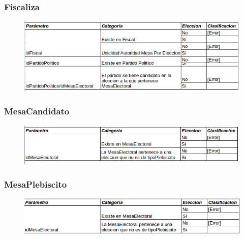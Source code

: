 \subsubsection{Fiscaliza}

\begin{figure}[H]
   \begin{center}
   \includegraphics[scale=0.7]{graphics/fiscaliza.png}
   \label{fig:der}
   \end{center}
\end{figure}


\subsubsection{MesaCandidato}

\begin{figure}[H]
   \begin{center}
   \includegraphics[scale=0.7]{graphics/mesacandidato.png}
   \label{fig:der}
   \end{center}
\end{figure}

\subsubsection{MesaPlebiscito}

\begin{figure}[H]
   \begin{center}
   \includegraphics[scale=0.7]{graphics/mesaplebiscito.png}
   \label{fig:der}
   \end{center}
\end{figure}


